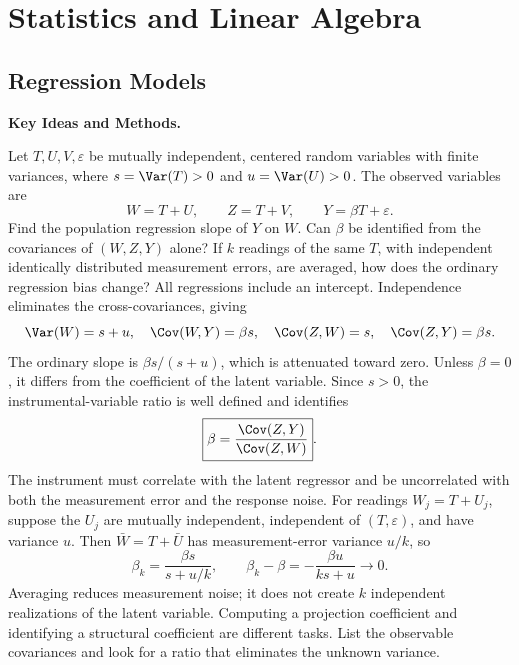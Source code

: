 \chapter{Statistics and Linear Algebra}

\section{Regression Models}
\noindent\textbf{Key Ideas and Methods.}\enspace



Let $T,U,V,\varepsilon$ be mutually independent, centered random variables with finite variances, where $s=\Var(T)>0$ and $u=\Var(U)>0$. The observed variables are
\[
 W=T+U,\qquad Z=T+V,\qquad Y=\beta T+\varepsilon.
\]
Find the population regression slope of $Y$ on $W$. Can $\beta$ be identified from the covariances of $(W,Z,Y)$ alone? If $k$ readings of the same $T$, with independent identically distributed measurement errors, are averaged, how does the ordinary regression bias change? All regressions include an intercept.
\solution Independence eliminates the cross-covariances, giving
\[
 \Var(W)=s+u,\quad \Cov(W,Y)=\beta s,
 \quad \Cov(Z,W)=s,\quad \Cov(Z,Y)=\beta s.
\]
The ordinary slope is $\beta s/(s+u)$, which is attenuated toward zero. Unless $\beta=0$, it differs from the coefficient of the latent variable. Since $s>0$, the instrumental-variable ratio is well defined and identifies
\[
 \boxed{\beta=\frac{\Cov(Z,Y)}{\Cov(Z,W)}}.
\]
The instrument must correlate with the latent regressor and be uncorrelated with both the measurement error and the response noise.
For readings $W_j=T+U_j$, suppose the $U_j$ are mutually independent, independent of $(T,\varepsilon)$, and have variance $u$. Then $\bar W=T+\bar U$ has measurement-error variance $u/k$, so
\[
 \beta_k=\frac{\beta s}{s+u/k},\qquad
 \beta_k-\beta=-\frac{\beta u}{ks+u}\longrightarrow0.
\]
Averaging reduces measurement noise; it does not create $k$ independent realizations of the latent variable.
\insight Computing a projection coefficient and identifying a structural coefficient are different tasks. List the observable covariances and look for a ratio that eliminates the unknown variance.


